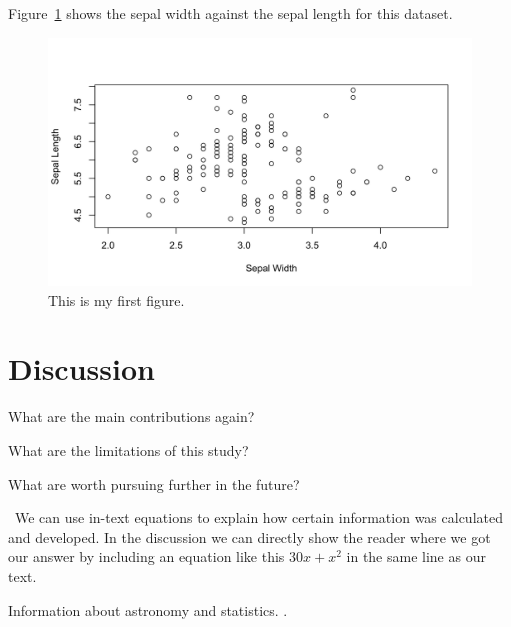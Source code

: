 \documentclass[12pt]{article}
\begin{document}
Figure~\ref{fig:iris} shows the sepal width against the sepal length for this dataset.

\begin{figure}[tbp]
  \centering
  \includegraphics[width=\textwidth]{iris.png}
  \caption{This is my first figure.}
  \label{fig:iris}
\end{figure}

\section{Discussion}
\label{sec:disc}

What are the main contributions again?

What are the limitations of this study?

What are worth pursuing further in the future?

\ We can use in-text equations to explain how certain information was calculated and developed. In the discussion we can directly show the reader where we got our answer by including an equation like this $30x+ x^2$ in the same line as our text. 

\lipsum[1-2]
Information about astronomy and statistics. \citep{ZhangZhao2015Astronomy}.



\end{document}
